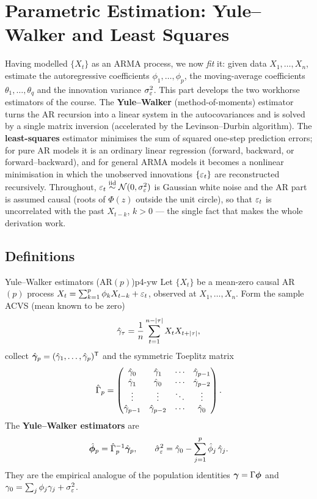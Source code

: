 \section{Parametric Estimation: Yule--Walker and Least Squares}
\label{sec:estimation}

Having modelled $\{X_t\}$ as an ARMA process, we now \emph{fit} it: given data
$X_1,\dots,X_n$, estimate the autoregressive coefficients $\phi_1,\dots,\phi_p$,
the moving-average coefficients $\theta_1,\dots,\theta_q$ and the innovation
variance $\sigma_\varepsilon^2$. This part develops the two workhorse estimators of the
course. The \textbf{Yule--Walker} (method-of-moments) estimator turns the AR
recursion into a linear system in the autocovariances and is solved by a single
matrix inversion (accelerated by the Levinson--Durbin algorithm). The
\textbf{least-squares} estimator minimises the sum of squared one-step
prediction errors; for pure AR models it is an ordinary linear regression
(forward, backward, or forward--backward), and for general ARMA models it
becomes a nonlinear minimisation in which the unobserved innovations
$\{\varepsilon_t\}$ are reconstructed recursively. Throughout, $\varepsilon_t\overset{\text{iid}}{\sim}\mathcal
N(0,\sigma_\varepsilon^2)$ is Gaussian white noise and the AR part is assumed causal
(roots of $\Phi(z)$ outside the unit circle), so that $\varepsilon_t$ is uncorrelated
with the past $X_{t-k}$, $k>0$ --- the single fact that makes the whole
derivation work.

\subsection{Definitions}

\begin{definition}{Yule--Walker estimators (AR$(p)$)}{p4-yw}
Let $\{X_t\}$ be a mean-zero causal AR$(p)$ process
$X_t=\sum_{k=1}^p\phi_kX_{t-k}+\varepsilon_t$, observed at $X_1,\dots,X_n$. Form the
sample ACVS (mean known to be zero)
\[
\hat{\gamma}_\tau=\frac1n\sum_{t=1}^{n-\left\lvert \tau \right\rvert}X_tX_{t+\left\lvert \tau \right\rvert},
\]
collect $\hat{\boldsymbol{\gamma}}_p=(\hat{\gamma}_1,\dots,\hat{\gamma}_p)^{\mathsf{T}}$ and the
symmetric Toeplitz matrix
\[
\hat\Gamma_p=
\begin{pmatrix}
\hat{\gamma}_0 & \hat{\gamma}_1 & \cdots & \hat{\gamma}_{p-1}\\
\hat{\gamma}_1 & \hat{\gamma}_0 & \cdots & \hat{\gamma}_{p-2}\\
\vdots & \vdots & \ddots & \vdots\\
\hat{\gamma}_{p-1} & \hat{\gamma}_{p-2} & \cdots & \hat{\gamma}_0
\end{pmatrix}.
\]
The \textbf{Yule--Walker estimators} are
\[
\hat{\boldsymbol\phi}_p=\hat\Gamma_p^{-1}\hat{\boldsymbol{\gamma}}_p,
\qquad
\hat\sigma_\varepsilon^2=\hat{\gamma}_0-\sum_{j=1}^p\hat\phi_j\,\hat{\gamma}_j .
\]
They are the empirical analogue of the population identities
$\boldsymbol{\gamma}=\Gamma\boldsymbol\phi$ and
$\gamma_0=\sum_j\phi_j\gamma_j+\sigma_\varepsilon^2$.
\end{definition}

